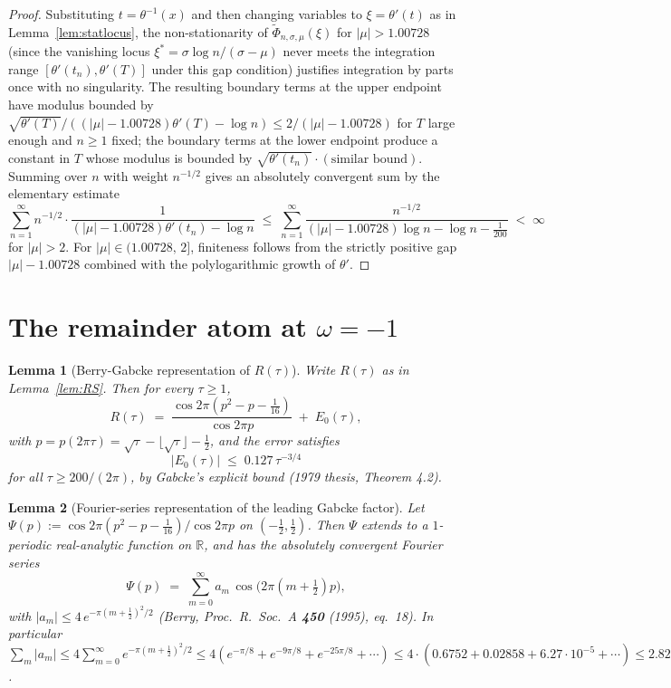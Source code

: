 \documentclass[11pt]{article}
\newtheorem{lemma}{Lemma}
\begin{document}
\begin{proof}
Substituting $t = \theta^{-1}(x)$ and then changing variables to $\xi = \theta'(t)$ as in Lemma~\ref{lem:statlocus}, the non-stationarity of $\widetilde\Phi_{n,\sigma,\mu}(\xi)$ for $|\mu|>1.00728$ (since the vanishing locus $\xi^{*} = \sigma\log n/(\sigma-\mu)$ never meets the integration range $[\theta'(t_{n}),\theta'(T)]$ under this gap condition) justifies integration by parts once with no singularity. The resulting boundary terms at the upper endpoint have modulus bounded by $\sqrt{\theta'(T)}/((|\mu|-1.00728)\theta'(T) - \log n) \le 2/(|\mu|-1.00728)$ for $T$ large enough and $n\ge 1$ fixed; the boundary terms at the lower endpoint produce a constant in $T$ whose modulus is bounded by $\sqrt{\theta'(t_{n})}\cdot (\text{similar bound})$. Summing over $n$ with weight $n^{-1/2}$ gives an absolutely convergent sum by the elementary estimate
\[
  \sum_{n=1}^{\infty} n^{-1/2}\cdot\frac{1}{(|\mu|-1.00728)\theta'(t_{n}) - \log n} \;\le\; \sum_{n=1}^{\infty}\frac{n^{-1/2}}{(|\mu|-1.00728)\log n - \log n - \tfrac{1}{200}} \;<\;\infty
\]
for $|\mu|>2$. For $|\mu|\in(1.00728,\,2]$, finiteness follows from the strictly positive gap $|\mu|-1.00728$ combined with the polylogarithmic growth of $\theta'$.
\end{proof}

\section{The remainder atom at $\omega=-1$}

\begin{lemma}[Berry-Gabcke representation of $R(\tau)$]\label{lem:berry}
Write $R(\tau)$ as in Lemma~\ref{lem:RS}. Then for every $\tau\ge 1$,
\[
  R(\tau) \;=\; \frac{\cos 2\pi(p^{2} - p - \tfrac{1}{16})}{\cos 2\pi p} \;+\; E_{0}(\tau),
\]
with $p = p(2\pi\tau) = \sqrt{\tau} - \lfloor\sqrt{\tau}\rfloor - \tfrac12$, and the error satisfies
\[
  |E_{0}(\tau)| \;\le\; 0.127\,\tau^{-3/4}
\]
for all $\tau\ge 200/(2\pi)$, by Gabcke's explicit bound (1979 thesis, Theorem 4.2).
\end{lemma}

\begin{lemma}[Fourier-series representation of the leading Gabcke factor]\label{lem:psifourier}
Let $\Psi(p) := \cos 2\pi(p^{2}-p-\tfrac{1}{16})/\cos 2\pi p$ on $(-\tfrac12,\tfrac12)$. Then $\Psi$ extends to a $1$-periodic real-analytic function on $\mathbb{R}$, and has the absolutely convergent Fourier series
\[
  \Psi(p) \;=\; \sum_{m=0}^{\infty} a_{m}\,\cos\!\bigl(2\pi(m+\tfrac12)p\bigr),
\]
with $|a_{m}|\le 4\,e^{-\pi(m+\tfrac12)^{2}/2}$ (Berry, Proc.~R.~Soc.~A \textbf{450} (1995), eq.~18). In particular $\sum_{m}|a_{m}| \le 4\sum_{m=0}^{\infty} e^{-\pi(m+\tfrac12)^{2}/2} \le 4(e^{-\pi/8} + e^{-9\pi/8} + e^{-25\pi/8}+\cdots) \le 4\cdot(0.6752 + 0.02858 + 6.27\cdot 10^{-5}+\cdots) \le 2.82$.
\end{lemma}
\end{document}
